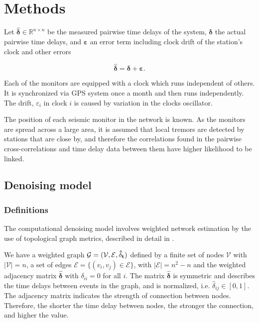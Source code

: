\documentclass[12pt,a4paper,english]{article}
\begin{document}
\section{Methods}


Let $\bm{\hat{\delta}} \in \mathbb{R}^{n\times n}$ be the measured pairwise time delays of the system, $\bm{\delta}$ the actual pairwise time delays, and $\bm{\varepsilon}$ an error term including clock drift of the station's clock and other errors

\begin{equation}
\bm{\hat{\delta}}  = \bm{\delta} + \bm{\varepsilon}.
\label{eq:model}
\end{equation}
 
Each of the monitors are equipped with a clock which runs independent of others. It is synchronized via GPS system once a month and then runs independently. The drift, $\varepsilon_i$ in clock $i$ is caused by variation in the clocks oscillator.  

The position of each seismic monitor in the network is known. As the monitors are spread across a large area, it is assumed that local tremors are detected by stations that are close by, and therefore the correlations found in the pairwise cross-correlations and time delay data between them have higher likelihood to be linked. 

\subsection{Denoising model}\label{sec:denoising}
\subsubsection{Definitions}
The computational denoising model involves weighted network estimation by the use of topological graph metrics, described in detail in \cite{Spyrou2017}. 

We have a weighted graph $\mathcal{G} = (\mathcal{V}, \mathcal{E}, \bf{\hat{\delta}}_t)$ defined by a finite set of nodes $\mathcal{V}$ with $|\mathcal{V}| = n$, a set of edges $\mathcal{E} = \{ (v_i,v_j) \in \mathcal{E} \}$, with $|\mathcal{E}| = n^2-n$ and the weighted adjacency matrix $\bm{\hat{\delta}}$ with $\delta_{ii} = 0$ for all $i$. The matrix $\bm{\hat{\delta}}$  is symmetric and describes the time delays between events in the graph, and is normalized, i.e. $\hat{\delta}_{ij}\in [0,1]$. The adjacency matrix indicates the strength of connection between nodes. Therefore, the shorter the time delay between nodes, the stronger the connection, and higher the value. 
\end{document}
